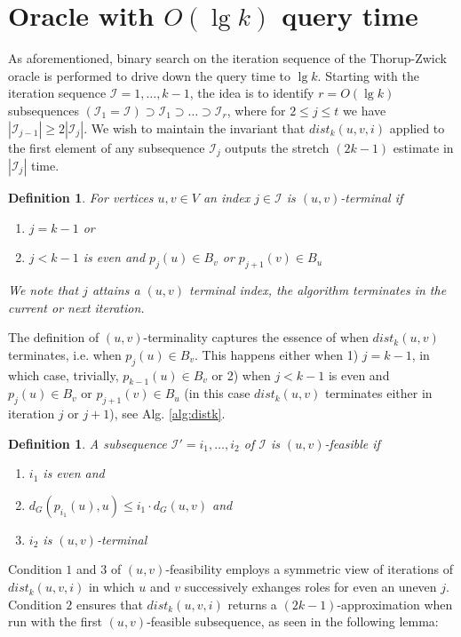 \documentclass[12pt]{article}
\newtheorem{defi}[thm]{Definition}
\begin{document}
\section{Oracle with $O(\lg k)$ query time}
As aforementioned, binary search on the iteration sequence of the Thorup-Zwick oracle is performed to drive down the query time to $\lg k$. Starting with the iteration sequence $\mathcal{I}=1,\hdots,k-1$, the idea is to identify $r=O(\lg k)$ subsequences $(\mathcal{I}_1=\mathcal{I}) \supset \mathcal{I}_1 \supset \hdots \supset \mathcal{I}_r$, where for $2 \leq j \leq t$ we have $|\mathcal{I}_{j-1}| \geq 2|\mathcal{I}_j|$. We wish to maintain the invariant that $dist_k(u,v,i)$ applied to the first element of any subsequence $\mathcal{I}_j$ outputs the stretch $(2k-1)$ estimate in $|\mathcal{I}_j|$ time.
\\
\begin{defi}
For vertices $u,v \in V$ an index $j \in \mathcal{I}$ is $(u,v)$-terminal if
\begin{enumerate}
\item $j = k-1$ or
\item $j < k-1$ is even and $p_j(u) \in B_v$ or $p_{j+1}(v) \in B_u$ 
\end{enumerate}
We note that $j$ attains a $(u,v)$ terminal index, the algorithm terminates in the current or next iteration. \label{def:uvterm}
\end{defi}
The definition of $(u,v)$-terminality captures the essence of when $dist_k(u,v)$ terminates, i.e. when $p_j(u) \in B_v$. This happens either when 1) $j=k-1$, in which case, trivially, $p_{k-1}(u) \in B_v$ or 2) when $j < k-1$ is even and $p_j(u) \in B_v$ or $p_{j+1}(v) \in B_u$ (in this case $dist_k(u,v)$ terminates either in iteration $j$ or $j+1$), see Alg. \ref{alg:distk}.
\\
\begin{defi}
A subsequence $\mathcal{I'}=i_1, \hdots, i_2$ of $\mathcal{I}$ is $(u,v)$-feasible if
\begin{enumerate}
\item $i_1$ is even and
\item $d_{G}(p_{i_1}(u),u) \leq i_1 \cdot d_G(u,v)$ and
\item $i_2$ is $(u,v)$-terminal
\end{enumerate}
\label{def:uvfeas}
\end{defi}
Condition $1$ and $3$ of $(u,v)$-feasibility employs a symmetric view of iterations of $dist_k(u,v,i)$ in which $u$ and $v$ successively exhanges roles for even an uneven $j$. Condition $2$ ensures that $dist_k(u,v,i)$ returns a $(2k-1)$-approximation when run with the first $(u,v)$-feasible subsequence, as seen in the following lemma:
\end{document}
